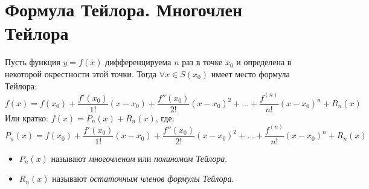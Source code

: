 \section{Формула Тейлора. Многочлен Тейлора}

\begin{theorem}
  Пусть функция $y = f(x)$ дифференцируема $n$ раз в точке $x_0$ и определена в некоторой окрестности этой точки. Тогда $\forall x \in S(x_0)$ имеет место формула Тейлора: \[
    f(x) = f(x_0) + \frac{f'(x_0)}{1!}(x - x_0) + \frac{f''(x_0)}{2!}(x - x_0)^2 + \ldots + \frac{f^{(n)}}{n!}(x - x_0)^n + R_n(x)
    \]
  Или кратко: $f(x) = P_n(x) + R_n(x)$, где:  \[
    P_n(x) = f(x_0) + \frac{f'(x_0)}{1!}(x - x_0) + \frac{f''(x_0)}{2!}(x - x_0)^2 + \ldots + \frac{f^{(n)}}{n!}(x - x_0)^n + R_n(x)
  \] 
\end{theorem}

\begin{itemize}
  \item $P_n(x)$ называют \textit{многочленом} или \textit{полиномом Тейлора}.
  \item $R_n(x)$ называют \textit{остаточным членов формулы Тейлора}.
\end{itemize}

